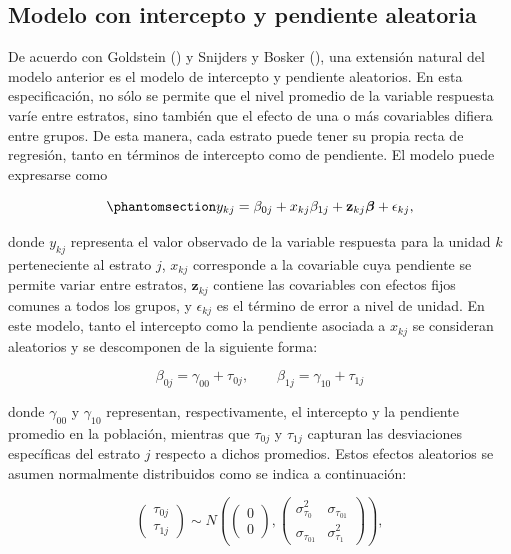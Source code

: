 \documentclass[
  spanish,
  11pt,
  letterpaper,
  oneside,
  open=any]{scrbook}
\begin{document}
\subsection{Modelo con intercepto y pendiente
aleatoria}\label{sec-intercepto-pendiente-aleatorios}

De acuerdo con Goldstein ()
y Snijders y Bosker (), una extensión
natural del modelo anterior es el modelo de intercepto y pendiente
aleatorios. En esta especificación, no sólo se permite que el nivel
promedio de la variable respuesta varíe entre estratos, sino también que
el efecto de una o más covariables difiera entre grupos. De esta manera,
cada estrato puede tener su propia recta de regresión, tanto en términos
de intercepto como de pendiente. El modelo puede expresarse como

\begin{equation}\protect\phantomsection\label{eq-modelo-pendiente-aleatoria}{
y_{kj} = \beta_{0j} + x_{kj}\beta_{1j} + \mathbf{z}_{kj}\boldsymbol{\beta} + \epsilon_{kj},
}\end{equation}

donde \(y_{kj}\) representa el valor observado de la variable respuesta
para la unidad \(k\) perteneciente al estrato \(j\), \(x_{kj}\)
corresponde a la covariable cuya pendiente se permite variar entre
estratos, \(\mathbf{z}_{kj}\) contiene las covariables con efectos fijos
comunes a todos los grupos, y \(\epsilon_{kj}\) es el término de error a
nivel de unidad. En este modelo, tanto el intercepto como la pendiente
asociada a \(x_{kj}\) se consideran aleatorios y se descomponen de la
siguiente forma:

\[
\beta_{0j} = \gamma_{00} + \tau_{0j}, \qquad
\beta_{1j} = \gamma_{10} + \tau_{1j}
\]

donde \(\gamma_{00}\) y \(\gamma_{10}\) representan, respectivamente, el
intercepto y la pendiente promedio en la población, mientras que
\(\tau_{0j}\) y \(\tau_{1j}\) capturan las desviaciones específicas del
estrato \(j\) respecto a dichos promedios. Estos efectos aleatorios se
asumen normalmente distribuidos como se indica a continuación:

\[
\begin{pmatrix}
\tau_{0j} \\
\tau_{1j}
\end{pmatrix}
\sim
N\left(
\begin{pmatrix}
0 \\
0
\end{pmatrix},
\begin{pmatrix}
\sigma_{\tau_0}^2 & \sigma_{\tau_{01}} \\
\sigma_{\tau_{01}} & \sigma_{\tau_1}^2
\end{pmatrix}
\right),
\]
\end{document}
